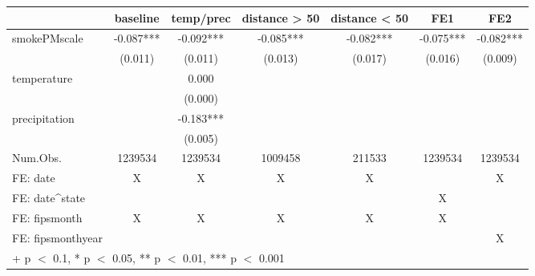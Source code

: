\begin{table}
\centering
\begin{tabular}[t]{lcccccc}
\toprule
  & baseline & temp/prec & distance > 50 & distance < 50 & FE1 & FE2\\
\midrule
smokePMscale & -0.087*** & -0.092*** & -0.085*** & -0.082*** & -0.075*** & -0.082***\\
 & (0.011) & (0.011) & (0.013) & (0.017) & (0.016) & (0.009)\\
temperature &  & 0.000 &  &  &  & \\
 &  & (0.000) &  &  &  & \\
precipitation &  & -0.183*** &  &  &  & \\
 &  & (0.005) &  &  &  & \\
\midrule
Num.Obs. & 1239534 & 1239534 & 1009458 & 211533 & 1239534 & 1239534\\
FE: date & X & X & X & X &  & X\\
FE: date^state &  &  &  &  & X & \\
FE: fipsmonth & X & X & X & X & X & \\
FE: fipsmonthyear &  &  &  &  &  & X\\
\bottomrule
\multicolumn{7}{l}{\rule{0pt}{1em}+ p $<$ 0.1, * p $<$ 0.05, ** p $<$ 0.01, *** p $<$ 0.001}\\
\end{tabular}
\end{table}
